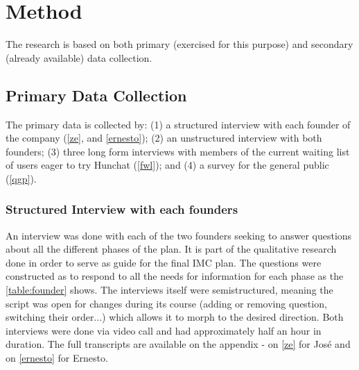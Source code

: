 \documentclass[12pt]{article}
\begin{document}
\section{Method}\label{method}
The research is based on both primary (exercised for this purpose) and secondary (already available) data collection. 

\subsection{Primary Data Collection}
The primary data is collected by: (1) a structured interview with each founder of the company (\ref{ze}, and \ref{ernesto}); (2) an unstructured interview with both founders; (3) three long form interviews with members of the current waiting list of users eager to try Hunchat (\ref{fwl}); and (4) a survey for the general public (\ref{qgp}). 

\subsubsection{Structured Interview with each founders}
An interview was done with each of the two founders seeking to answer questions about all the different phases of the plan. It is part of the qualitative research done in order to serve as guide for the final IMC plan. The questions were constructed as to respond to all the needs for information for each phase as the \ref{table:founder} shows. The interviews itself were semistructured, meaning the script was open for changes during its course (adding or removing question, switching their order...) which allows it to morph to the desired direction. Both interviews were done via video call and had approximately half an hour in duration. The full transcripts are available on the appendix - on \ref{ze} for José and on \ref{ernesto} for Ernesto. 
\end{document}
